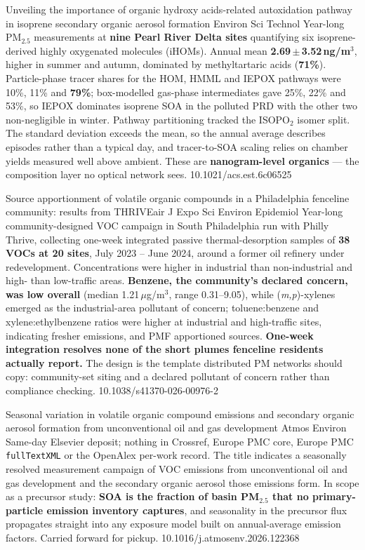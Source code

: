 \documentclass[10pt]{article}
\begin{document}
{Unveiling the importance of organic hydroxy acids-related autoxidation pathway in isoprene
secondary organic aerosol formation}
{Environ Sci Technol}
{Year-long PM$_{2.5}$ measurements at \textbf{nine Pearl River Delta sites} quantifying six
isoprene-derived highly oxygenated molecules (iHOMs). Annual mean
\textbf{2.69\,$\pm$\,3.52\,ng/m$^3$}, higher in summer and autumn, dominated by
methyltartaric acids (\textbf{71\%}). Particle-phase tracer shares for the HOM, HMML and
IEPOX pathways were 10\%, 11\% and \textbf{79\%}; box-modelled gas-phase intermediates gave
25\%, 22\% and 53\%, so IEPOX dominates isoprene SOA in the polluted PRD with the other two
non-negligible in winter. Pathway partitioning tracked the ISOPO$_2$ isomer split. The
standard deviation exceeds the mean, so the annual average describes episodes rather than a
typical day, and tracer-to-SOA scaling relies on chamber yields measured well above ambient.
These are \textbf{nanogram-level organics} --- the composition layer no optical network sees.}
{10.1021/acs.est.6c06525}

{Source apportionment of volatile organic compounds in a Philadelphia fenceline community:
results from THRIVEair}
{J Expo Sci Environ Epidemiol}
{Year-long community-designed VOC campaign in South Philadelphia run with Philly Thrive,
collecting one-week integrated passive thermal-desorption samples of \textbf{38 VOCs at 20
sites}, July 2023 -- June 2024, around a former oil refinery under redevelopment.
Concentrations were higher in industrial than non-industrial and high- than low-traffic
areas. \textbf{Benzene, the community's declared concern, was low overall} (median
1.21\,$\mu$g/m$^3$, range 0.31--9.05), while (\textit{m,p})-xylenes emerged as the
industrial-area pollutant of concern; toluene:benzene and xylene:ethylbenzene ratios were
higher at industrial and high-traffic sites, indicating fresher emissions, and PMF
apportioned sources. \textbf{One-week integration resolves none of the short plumes
fenceline residents actually report.} The design is the template distributed PM networks
should copy: community-set siting and a declared pollutant of concern rather than
compliance checking.}
{10.1038/s41370-026-00976-2}

{Seasonal variation in volatile organic compound emissions and secondary organic aerosol
formation from unconventional oil and gas development}
{Atmos Environ}
{Same-day Elsevier deposit; nothing in Crossref, Europe PMC core, Europe PMC
\texttt{fullTextXML} or the OpenAlex per-work record. The title indicates a seasonally
resolved measurement campaign of VOC emissions from unconventional oil and gas development
and the secondary organic aerosol those emissions form. In scope as a precursor study:
\textbf{SOA is the fraction of basin PM$_{2.5}$ that no primary-particle emission inventory
captures}, and seasonality in the precursor flux propagates straight into any exposure
model built on annual-average emission factors. Carried forward for pickup.}
{10.1016/j.atmosenv.2026.122368}
\end{document}

